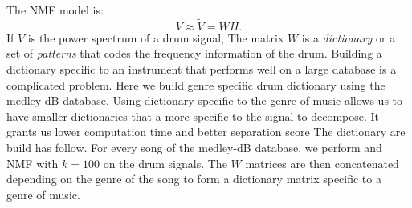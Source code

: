 \documentclass{article}
\begin{document}
The NMF model is:
\begin{equation}
V \approx \tilde{V} = WH.
\end{equation}
If $V$ is the power spectrum of a drum signal, The matrix $W$ is a {\em dictionary} or a set of {\em patterns} that codes the frequency information of the drum. Building a dictionary specific to an instrument that performs well on a large database is a complicated problem. Here we build genre specific drum dictionary using the medley-dB database. Using dictionary specific to the genre of music allows us to have smaller dictionaries that a more specific to the signal to decompose. It grants us lower computation time and better separation score
The dictionary are build has follow. For every song of the medley-dB database, we perform and NMF with $k=100$ on the drum signals. The $W$ matrices are then concatenated depending on the genre of the song to form a dictionary matrix specific to a genre of music. 





%
%
%
%
\end{document}
